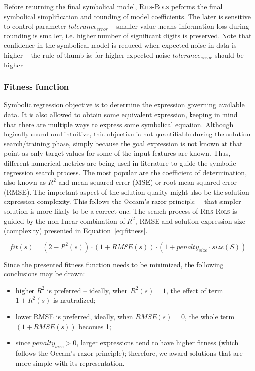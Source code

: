 \documentclass[a4paper,12pt]{elsarticle}
\begin{document}
Before returning the final symbolical model, \textsc{Rils}-\textsc{Rols}  peforms the final symbolical simplification and rounding of model coefficients. The later is sensitive to control parameter $tolerance_{error}$ -- smaller value means information loss during rounding is smaller, i.e. higher number of significant digits is preserved. Note that confidence in the symbolical model is reduced when expected noise in data is higher -- the rule of thumb is: for higher expected noise $tolerance_{error}$ should be higher. 


\subsubsection{Fitness function}\label{sec:fitness}

Symbolic regression objective is to determine the expression governing available data. It is also allowed to obtain some equivalent expression, keeping in mind that there are multiple ways to express some symbolical equation. Although logically sound and intuitive, this objective is not quantifiable during the solution search/training phase, simply because the goal expression is not known at that point as only target values for some of the input features are known. Thus, different numerical metrics are being used in literature to guide the symbolic regression search process. The most popular are the coefficient of determination, also known as $R^2$ and mean squared error (MSE) or root mean squared error (RMSE). The important aspect of the solution quality might also be the solution expression complexity. This follows the Occam's razor principle~\cite{costa2020fast}~ that simpler solution  is more likely to be a correct one. 
The search process of \textsc{Rils}-\textsc{Rols}  is guided by the non-linear combination of $R^2$, RMSE and solution expression size (complexity) presented in Equation~\ref{eq:fitness}. 

\begin{equation}
	\label{eq:fitness}
	fit(s) = (2-R^2(s)) \cdot (1+RMSE(s)) \cdot (1+penalty_{size} \cdot size(S))
\end{equation}

Since the presented fitness function needs to be minimized, the following conclusions may be drawn:
\begin{itemize}
	\item higher $R^2$ is preferred -- ideally, when $R^2(s)=1$, the effect of term $1+R^2(s)$ is neutralized; %
	\item lower RMSE is preferred, ideally, when $RMSE(s)=0$, the whole term $(1+RMSE(s))$ becomes 1;
	\item since $penalty_{size} > 0$, larger expressions tend to have higher fitness (which follows the Occam's razor principle); therefore, we award solutions that are more simple with its representation. 
\end{itemize}
\end{document}
